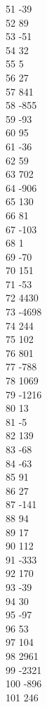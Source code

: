 { 51	-39 \\
 52	89 \\
 53	-51 \\
 54	32 \\
 55	5 \\
 56	27 \\
 57	841 \\
 58	-855 \\
 59	-93 \\
 60	95 \\
 61	-36 \\
 62	59 \\
 63	702 \\
 64	-906 \\
 65	130 \\
 66	81 \\
 67	-103 \\
 68	1 \\
 69	-70 \\
 70	151 \\
 71	-53 \\
 72	4430 \\
 73	-4698 \\
 74	244 \\
 75	102 \\
 76	801 \\
 77	-788 \\
 78	1069 \\
 79	-1216 \\
 80	13 \\
 81	-5 \\
 82	139 \\
 83	-68 \\
 84	-63 \\
 85	91 \\
 86	27 \\
 87	-141 \\
 88	94 \\
 89	17 \\
 90	112 \\
 91	-333 \\
 92	170 \\
 93	-39 \\
 94	30 \\
 95	-97 \\
 96	53 \\
 97	104 \\
 98	2961 \\
 99	-2321 \\
 100	-896 \\
 101	246 \\
}
